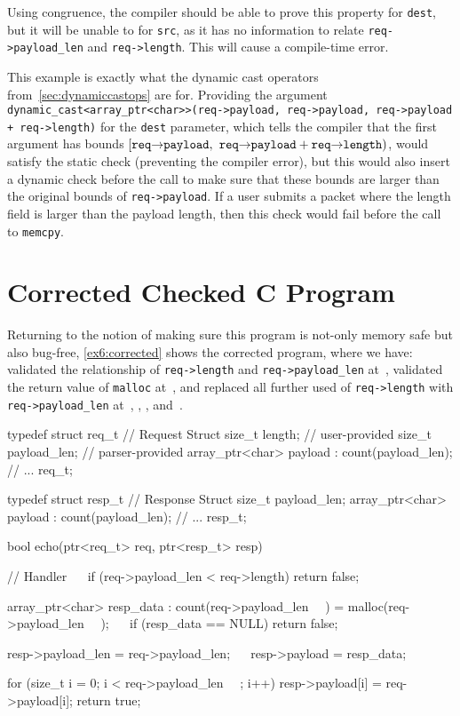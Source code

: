 Using congruence, the compiler should be able to prove this property
for \lstinline|dest|, but it will be unable to for \lstinline|src|, as
it has no information to relate \lstinline|req->payload_len| and
\lstinline|req->length|. This will cause a compile-time error.

This example is exactly what the dynamic cast operators
from~\autoref{sec:dynamiccastops} are for. Providing the argument
\lstinline|dynamic_cast<array_ptr<char>>(req->payload, req->payload, req->payload + req->length)|
for the \lstinline|dest| parameter, which tells the compiler that the
first argument has bounds $[\texttt{req} \mathord{\rightarrow} \texttt{payload},$
$\texttt{req} \mathord{\rightarrow} \texttt{payload} + \texttt{req} \mathord{\rightarrow}
\texttt{length} )$, would satisfy the static check (preventing the
compiler error), but this would also insert a dynamic check before the
call to make sure that these bounds are larger than the original
bounds of \lstinline|req->payload|. If a user submits a packet where
the length field is larger than the payload length, then this check
would fail before the call to \lstinline|memcpy|.

\section{Corrected Checked C Program}

Returning to the notion of making sure this program is not-only memory
safe but also bug-free, \autoref{ex6:corrected} shows the corrected
program, where we have: validated the relationship of
\lstinline|req->length| and \lstinline|req->payload_len|
at~, validated the return value of
\lstinline|malloc| at~, and replaced all further
used of \lstinline|req->length| with \lstinline|req->payload_len|
at~, , ,
and~.


\begin{code}[label=ex6:corrected,float=t,caption={Corrected Checked Example (Based on \autoref{ex2:checked})}]
typedef struct req_t {  // Request Struct
  size_t length;         // user-provided
  size_t payload_len;    // parser-provided
  array_ptr<char> payload : count(payload_len);
  // ...
} req_t;

typedef struct resp_t {  // Response Struct
  size_t payload_len;
  array_ptr<char> payload : count(payload_len);
  // ...
} resp_t;

bool echo(ptr<req_t> req, ptr<resp_t> resp) {  // Handler
~~  if (req->payload_len < req->length)
    return false;

  array_ptr<char> resp_data : count(req->payload_len ~~) = malloc(req->payload_len ~~);
~~  if (resp_data == NULL)
    return false;

  resp->payload_len = req->payload_len; ~~
  resp->payload     = resp_data;

  for (size_t i = 0; i < req->payload_len ~~; i++) {
    resp->payload[i] = req->payload[i];
  }
  return true;
}
\end{code}





